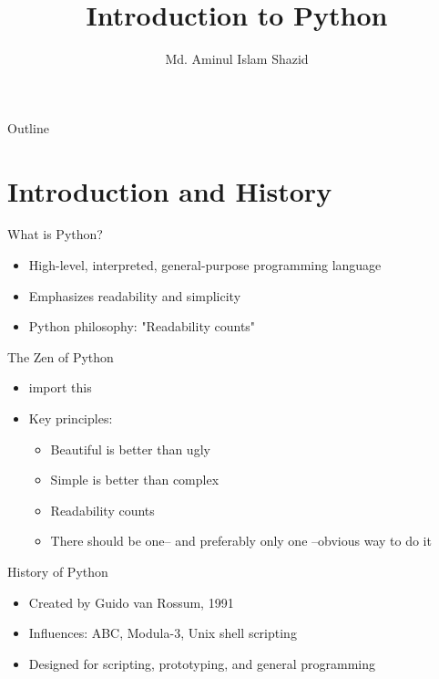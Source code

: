 \documentclass[12pt, aspectratio=169]{beamer}
\title{Introduction to Python}
\author{Md. Aminul Islam Shazid}
\date{}
\begin{document}
    {
		\addtocounter{framenumber}{-2}    %

		\begin{frame}
			\titlepage
		\end{frame}

		\begin{frame}{Outline}
            \vfill
			\tableofcontents[subsectionstyle=hide]
            \vfill
		\end{frame}
	}

    \section{Introduction and History}

    \begin{frame}{What is Python?}
        \begin{itemize}
            \item High-level, interpreted, general-purpose programming language
            \item Emphasizes readability and simplicity
            \item Python philosophy: "Readability counts"
        \end{itemize}
    \end{frame}


    \begin{frame}{The Zen of Python}
        \begin{itemize}
            \item import this
            \item Key principles:
            \begin{itemize}
                \item Beautiful is better than ugly
                \item Simple is better than complex
                \item Readability counts
                \item There should be one-- and preferably only one --obvious way to do it
            \end{itemize}
        \end{itemize}
    \end{frame}

    
    \begin{frame}{History of Python}
        \begin{itemize}
            \item Created by Guido van Rossum, 1991
            \item Influences: ABC, Modula-3, Unix shell scripting
            \item Designed for scripting, prototyping, and general programming
        \end{itemize}
    \end{frame}
\end{document}

